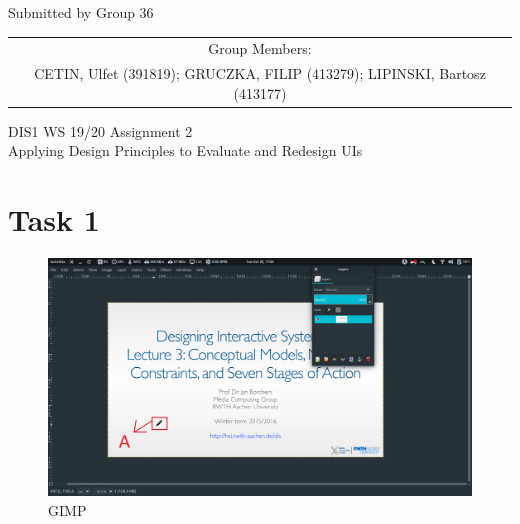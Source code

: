 \documentclass[a4paper,11pt,oneside]{scrreprt}
\begin{document}
\begin{center}
	Submitted by Group 36
	
	\bigskip
	
	\begin{tabular}{c}
	Group Members: \\
	CETIN, Ulfet (391819); GRUCZKA, FILIP (413279);	LIPINSKI, Bartosz (413177) \\
	\end{tabular}

	\bigskip
	
	DIS1 WS 19/20 Assignment 2\\
	Applying Design Principles to Evaluate and Redesign UIs
	
\end{center}

\section*{Task 1}

\begin{figure}[H]
	\centering
	\includegraphics[clip, trim=0cm 0cm 0cm 0cm, scale=0.33]{./images/gimp.png}
	\caption{GIMP}
	\label{fig:sub3}
\end{figure}
\end{document}

